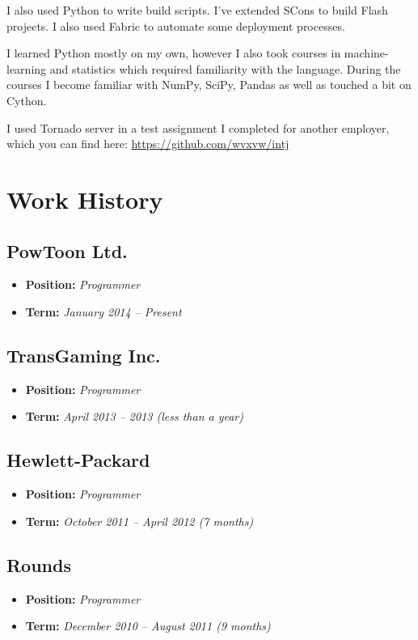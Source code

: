 \documentclass[11pt]{article}
\begin{document}
I also used Python to write build scripts.  I've extended SCons to build Flash
projects.  I also used Fabric to automate some deployment processes.

I learned Python mostly on my own, however I also took courses in
machine-learning and statistics which required familiarity with the language.
During the courses I become familiar with NumPy, SciPy, Pandas as well as
touched a bit on Cython.

I used Tornado server in a test assignment I completed for another employer,
which you can find here: \url{https://github.com/wvxvw/intj}
\section{Work History}
\label{sec-3}

\subsection{PowToon Ltd.}
\label{sec-3-1}
\begin{itemize}
\item \textbf{Position:} \emph{Programmer}
\item \textbf{Term:} \emph{January 2014 – Present}
\end{itemize}
\subsection{TransGaming Inc.}
\label{sec-3-2}
\begin{itemize}
\item \textbf{Position:} \emph{Programmer}
\item \textbf{Term:} \emph{April 2013 – 2013 (less than a year)}
\end{itemize}
\subsection{Hewlett-Packard}
\label{sec-3-3}
\begin{itemize}
\item \textbf{Position:} \emph{Programmer}
\item \textbf{Term:} \emph{October 2011 – April 2012 (7 months)}
\end{itemize}
\subsection{Rounds}
\label{sec-3-4}
\begin{itemize}
\item \textbf{Position:} \emph{Programmer}
\item \textbf{Term:} \emph{December 2010 – August 2011 (9 months)}
\end{itemize}
\end{document}
